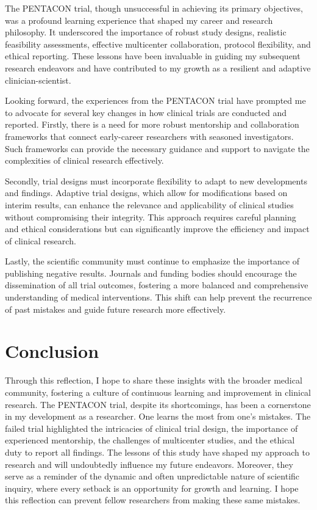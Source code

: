 \documentclass[authordate, reflection,issue]{jote-new-article}
\begin{document}
	The PENTACON trial, though unsuccessful in achieving its primary objectives, was a profound learning experience that shaped my career and research philosophy. It underscored the importance of robust study designs, realistic feasibility assessments, effective multicenter collaboration, protocol flexibility, and ethical reporting. These lessons have been invaluable in guiding my subsequent research endeavors and have contributed to my growth as a resilient and adaptive clinician-scientist.



	Looking forward, the experiences from the PENTACON trial have prompted me to advocate for several key changes in how clinical trials are conducted and reported. Firstly, there is a need for more robust mentorship and collaboration frameworks that connect early-career researchers with seasoned investigators. Such frameworks can provide the necessary guidance and support to navigate the complexities of clinical research effectively.



	Secondly, trial designs must incorporate flexibility to adapt to new developments and findings. Adaptive trial designs, which allow for modifications based on interim results, can enhance the relevance and applicability of clinical studies without compromising their integrity. This approach requires careful planning and ethical considerations but can significantly improve the efficiency and impact of clinical research.



	Lastly, the scientific community must continue to emphasize the importance of publishing negative results. Journals and funding bodies should encourage the dissemination of all trial outcomes, fostering a more balanced and comprehensive understanding of medical interventions. This shift can help prevent the recurrence of past mistakes and guide future research more effectively.



	\section{Conclusion}



	Through this reflection, I hope to share these insights with the broader medical community, fostering a culture of continuous learning and improvement in clinical research. The PENTACON trial, despite its shortcomings, has been a cornerstone in my development as a researcher. One learns the most from one's mistakes. The failed trial highlighted the intricacies of clinical trial design, the importance of experienced mentorship, the challenges of multicenter studies, and the ethical duty to report all findings. The lessons of this study have shaped my approach to research and will undoubtedly influence my future endeavors. Moreover, they serve as a reminder of the dynamic and often unpredictable nature of scientific inquiry, where every setback is an opportunity for growth and learning. I hope this reflection can prevent fellow researchers from making these same mistakes.
\end{document}
